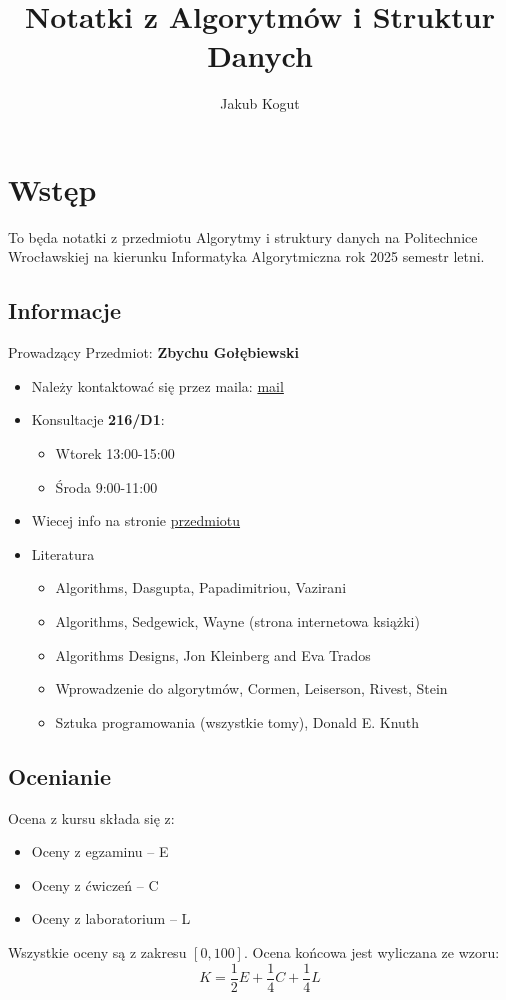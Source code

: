 \documentclass[11pt,a4paper]{article}
\title{Notatki z Algorytmów i Struktur Danych}
\author{Jakub Kogut}
\begin{document}
\maketitle

\tableofcontents  %
\newpage

\section{Wstęp}
To będa notatki z przedmiotu Algorytmy i struktury danych na Politechnice Wrocławskiej na kierunku Informatyka Algorytmiczna rok 2025 semestr letni.
\subsection{Informacje}
Prowadzący Przedmiot: \textbf{Zbychu Gołębiewski}
\begin{itemize}
    \item Należy kontaktować się przez maila: \href{mailto:zbigniew.golebiewski@pwr.edu.pl}{mail}
    \item Konsultacje \textbf{216/D1}:
        \begin{itemize}
            \item Wtorek 13:00-15:00
            \item Środa 9:00-11:00
        \end{itemize}
    \item Wiecej info na stronie \href{https://cs.pwr.edu.pl/golebiewski/teaching/aisd.php}{przedmiotu}
    \item Literatura
        \begin{itemize}
            \item Algorithms, Dasgupta, Papadimitriou, Vazirani
            \item Algorithms, Sedgewick, Wayne (strona internetowa książki)
            \item Algorithms Designs, Jon Kleinberg and Eva Trados
            \item Wprowadzenie do algorytmów, Cormen, Leiserson, Rivest, Stein
            \item Sztuka programowania (wszystkie tomy), Donald E. Knuth
        \end{itemize}
\end{itemize}
\subsection{Ocenianie}
Ocena z kursu składa się z:
\begin{itemize}
    \item Oceny z egzaminu -- E
    \item Oceny z ćwiczeń -- C
    \item Oceny z laboratorium -- L
\end{itemize}
Wszystkie oceny są z zakresu $[0,100]$. Ocena końcowa jest wyliczana ze wzoru:
\[
    K = \frac{1}{2}E + \frac{1}{4}C + \frac{1}{4}L
\]
\end{document}
